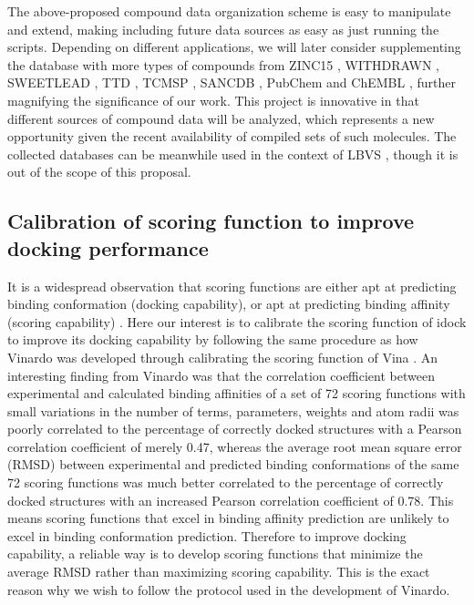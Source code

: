 \documentclass[a4paper,12pt]{article}
\begin{document}
The above-proposed compound data organization scheme is easy to manipulate and extend, making including future data sources as easy as just running the scripts. Depending on different applications, we will later consider supplementing the database with more types of compounds from ZINC15 \citep{1688}, WITHDRAWN \citep{1718}, SWEETLEAD \citep{1511}, TTD \citep{1790}, TCMSP \citep{1375}, SANCDB \citep{1680}, PubChem \citep{1701} and ChEMBL \citep{1424}, further magnifying the significance of our work. This project is innovative in that different sources of compound data will be analyzed, which represents a new opportunity given the recent availability of compiled sets of such molecules. The collected databases can be meanwhile used in the context of LBVS \citep{1749}, though it is out of the scope of this proposal.

\subsection*{Calibration of scoring function to improve docking performance}

It is a widespread observation that scoring functions are either apt at predicting binding conformation (docking capability), or apt at predicting binding affinity (scoring capability) \citep{1411,1695}. Here our interest is to calibrate the scoring function of idock \citep{1153} to improve its docking capability by following the same procedure as how Vinardo \citep{1741} was developed through calibrating the scoring function of Vina \citep{595}. An interesting finding from Vinardo was that the correlation coefficient between experimental and calculated binding affinities of a set of 72 scoring functions with small variations in the number of terms, parameters, weights and atom radii was poorly correlated to the percentage of correctly docked structures with a Pearson correlation coefficient of merely 0.47, whereas the average root mean square error (RMSD) between experimental and predicted binding conformations of the same 72 scoring functions was much better correlated to the percentage of correctly docked structures with an increased Pearson correlation coefficient of 0.78. This means scoring functions that excel in binding affinity prediction are unlikely to excel in binding conformation prediction. Therefore to improve docking capability, a reliable way is to develop scoring functions that minimize the average RMSD rather than maximizing scoring capability. This is the exact reason why we wish to follow the protocol used in the development of Vinardo.
\end{document}
